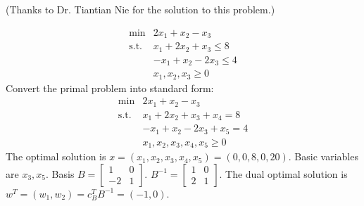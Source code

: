 \documentclass[12pt]{article}
\begin{document}
(Thanks to Dr. Tiantian Nie for the solution to this problem.)

\begin{equation*}
  \begin{array}{rl}
    \min & 2x_1+x_2-x_3 \\
    \text{s.t.} & x_1+2x_2+x_3\leq 8 \\
    & -x_1 + x_2 - 2x_3 \leq 4 \\
    & x_1,x_2,x_3 \geq 0
  \end{array}
\end{equation*}
Convert the primal problem into standard form:
  \begin{equation*}
  \begin{array}{rl}
    \min & 2x_1+x_2-x_3 \\
    \text{s.t.} & x_1+2x_2+x_3 + x_4 = 8 \\
    & -x_1 + x_2 - 2x_3 + x_5 = 4 \\
    & x_1,x_2,x_3,x_4,x_5 \geq 0
  \end{array}
  \end{equation*}
  The optimal solution is $x=(x_1,x_2,x_3,x_4,x_5)=(0,0,8,0,20)$. Basic variables are $x_3,x_5$. Basis $B=\begin{bmatrix}1& 0 \\-2& 1\end{bmatrix}$. $B^{-1}=\begin{bmatrix}1& 0 \\2& 1\end{bmatrix}$. The dual optimal solution is $w^T=(w_1,w_2)=c_B^TB^{-1}=(-1,0)$.
\end{document}
